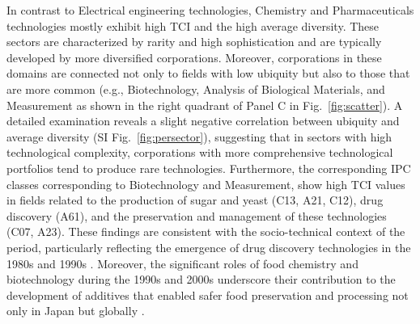 \documentclass[fleqn,10pt]{wlscirep}
\begin{document}
In contrast to Electrical engineering technologies, Chemistry and Pharmaceuticals technologies mostly exhibit high TCI and the high average diversity. 
These sectors are characterized by rarity and high sophistication and are typically developed by more diversified corporations. 
Moreover, corporations in these domains are connected not only to fields with low ubiquity but also to those that are more common (e.g., Biotechnology, Analysis of Biological Materials, and Measurement as shown in the right quadrant of Panel C in Fig.~\ref{fig:scatter}). 
A detailed examination reveals a slight negative correlation between ubiquity and average diversity (SI Fig.~\ref{fig:persector}), suggesting that in sectors with high technological complexity, corporations with more comprehensive technological portfolios tend to produce rare technologies. 
Furthermore, the corresponding IPC classes corresponding to Biotechnology and Measurement, show high TCI values in fields related to the production of sugar and yeast (C13, A21, C12), drug discovery (A61), and the preservation and management of these technologies (C07, A23). These findings are consistent with the socio-technical context of the period, particularly reflecting the emergence of drug discovery technologies in the 1980s and 1990s \cite{Sakakibara2014,Nakamura2022}. Moreover, the significant roles of food chemistry and biotechnology during the 1990s and 2000s underscore their contribution to the development of additives that enabled safer food preservation and processing not only in Japan but globally \cite{Bhatia2018,Murakami2024}.


\end{document}
